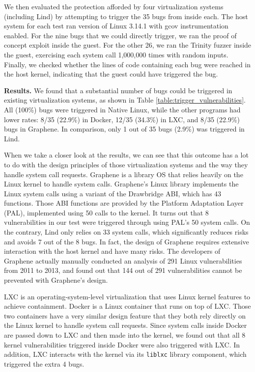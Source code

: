 {{{We then evaluated the protection afforded by four virtualization systems (including Lind) by attempting to trigger the 35 bugs from inside each.
The host system for each test ran version of Linux 3.14.1 with gcov instrumentation enabled.
For the nine bugs that we could directly trigger, we ran the proof of concept exploit inside the guest.
For the other 26, we ran the Trinity fuzzer inside the guest, exercising each system call 1,000,000 times with random inputs.
Finally, we checked whether the lines of code containing each bug were reached in the host kernel, 
indicating that the guest could have triggered the bug.

\noindent
\textbf{Results.}
We found that a substantial number of bugs could be triggered in existing
virtualization systems, as shown in Table \ref{table:trigger_vulnerabilities}.
All (100\%) bugs were triggered in Native Linux,
while the other programs had lower rates: 8/35 (22.9\%)  in Docker,
12/35 (34.3\%)  in LXC, and 8/35 (22.9\%) bugs in Graphene.
In comparison, only 1 out of 35 bugs  (2.9\%) was triggered in Lind.


When we take a closer look at the results, we can see that this outcome 
has a lot to do with the design principles of those virtualization systems and 
the way they handle system call requests. 
Graphene \cite{Graphene-14} is a library OS that relies heavily on the Linux kernel to handle system calls. 
Graphene's Linux library implements the Linux system calls using a variant of the 
Drawbridge \cite{Drawbridge-11} ABI, which has 43 functions. Those ABI functions 
are provided by the Platform Adaptation Layer (PAL), implemented using 50 calls 
to the kernel. It turns out that 8 vulnerabilities in our test were triggered through using PAL's 
50 system calls. On the contrary, Lind only relies on 33 system calls, which significantly reduces 
risks and avoids 7 out of the 8 bugs. In fact, the design of Graphene requires extensive interaction 
with the host kernel and have many risks. The developers of Graphene actually manually conducted 
an analysis of 291 Linux vulnerabilities from 2011 to 2013, and found out that 144 out of 291 vulnerabilities 
cannot be prevented with Graphene's design. 

LXC \cite{LXC} is an operating-system-level virtualization that uses Linux kernel features to achieve containment. 
Docker \cite{Docker} is a Linux container that runs on top of LXC. Those two containers have a very similar design feature 
that they both rely directly on the Linux kernel to handle system call requests. Since system calls inside Docker are passed down 
to LXC and then made into the kernel, we found out that all 8 kernel vulnerabilities triggered inside Docker were also triggered 
with LXC. In addition, LXC interacts with the kernel via its \texttt{liblxc} library component, which triggered the extra 4 bugs. 

}}}
